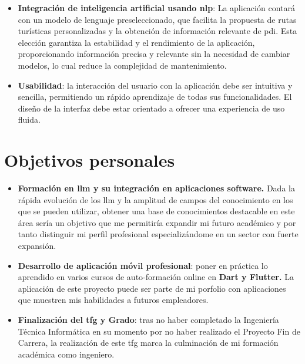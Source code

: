 \begin{itemize}
	\item \textbf{Integración de inteligencia artificial usando \acrfull{nlp}}: La aplicación contará con un modelo de lenguaje preseleccionado, que facilita la propuesta de rutas turísticas personalizadas y la obtención de información relevante de \acrlong{pdi}. Esta elección garantiza la estabilidad y el rendimiento de la aplicación, proporcionando información precisa y relevante sin la necesidad de cambiar modelos, lo cual reduce la complejidad de mantenimiento.
    \item \textbf{Usabilidad}: la interacción del usuario con la aplicación debe ser intuitiva y sencilla, permitiendo un rápido aprendizaje de todas sus funcionalidades. El diseño de la interfaz debe estar orientado a ofrecer una experiencia de uso fluida. 
\end{itemize}

\section{Objetivos personales}

\begin{itemize}
	\item \textbf{Formación en \acrshort{llm} y su integración en aplicaciones software.} Dada la rápida evolución de los \acrfull{llm} y la amplitud de campos del conocimiento en los que se pueden utilizar, obtener una base de conocimientos destacable en este área sería un objetivo que me permitiría expandir mi futuro académico y por tanto distinguir mi perfil profesional especializándome en un sector con fuerte expansión.
	\item \textbf{Desarrollo de aplicación móvil profesional}: poner en práctica lo aprendido en varios cursos de auto-formación online en \textbf{Dart y Flutter.} La aplicación de este proyecto puede ser parte de mi porfolio con aplicaciones que muestren mis habilidades a futuros empleadores.
	\item \textbf{Finalización del \acrshort{tfg} y Grado}: tras no haber completado la Ingeniería Técnica Informática en su momento por no haber realizado el Proyecto Fin de Carrera, la realización de este \acrshort{tfg} marca la culminación de mi formación académica como ingeniero.
\end{itemize}
